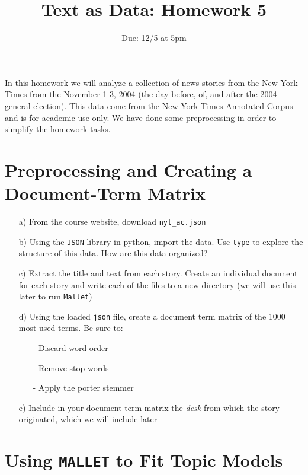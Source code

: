 \documentclass[12pt,letterpaper]{article}
\title{Text as Data: Homework 5}
\date{Due: 12/5 at 5pm}
\begin{document}
\maketitle

In this homework we will analyze a collection of news stories from the New York Times from the November 1-3, 2004 (the day before, of, and after the 2004 general election). This data come from the New York Times Annotated Corpus and is for academic use only. We have done some preprocessing in order to simplify the homework tasks.


\section{Preprocessing and Creating a Document-Term Matrix}

\begin{itemize}
\item[a)] From the course website, download {\tt nyt\_ac.json} 
\item[b)] Using the {\tt JSON} library in python, import the data. Use {\tt type} to explore the structure of this data. How are this data organized?
\item[c)] Extract the title and text from each story.  Create an individual document for each story and write each of the files to a new directory (we will use this later to run {\tt Mallet})
\item[d)] Using the loaded {\tt json} file, create a document term matrix of the 1000 most used terms.  Be sure to: 
\begin{itemize}
\item[-] Discard word order
\item[-] Remove stop words
\item[-] Apply the porter stemmer
\end{itemize}
\item[e)] Include in your document-term matrix the \emph{desk} from which the story originated, which we will include later
\end{itemize}


\section{Using {\tt MALLET} to Fit Topic Models}
\end{document}
